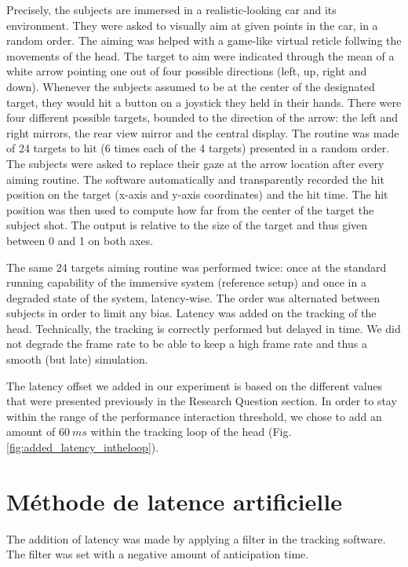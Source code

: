 	\par Precisely, the subjects are immersed in a realistic-looking car and its environment. They were  asked to visually aim at given points in the car, in a random order. The aiming was helped with a game-like virtual reticle follwing the movements of the head. The target to aim were indicated through the mean of a white arrow pointing one out of four possible directions (left, up, right and down). Whenever the subjects assumed to be at the center of the designated target, they would hit a button on a joystick they held in their hands. There were four different possible targets, bounded to the direction of the arrow: the left and right mirrors, the rear view mirror and the central display. The routine was made of 24 targets to hit (6 times each of the 4 targets) presented in a random order. The subjects were asked to replace their gaze at the arrow location after every aiming routine. The software automatically and transparently recorded the hit position on the target (x-axis and y-axis coordinates) and the hit time. The hit position was then used to compute how far from the center of the target the subject shot. The output is relative to the size of the target and thus given between 0 and 1 on both axes.


	\par The same 24 targets aiming routine was performed twice: once at the standard running capability of the immersive system (reference setup) and once in a degraded state of the system, latency-wise. The order was alternated between subjects in order to limit any bias. Latency was added on the tracking of the head. Technically, the tracking is correctly performed but delayed in time. We did not degrade the frame rate to be able to keep a high frame rate and thus a smooth (but late) simulation.

	\par The latency offset we added in our experiment is based on the different values that were presented previously in the Research Question section. In order to stay within the range of the performance interaction threshold, we chose to add an amount of $60~ms$ within the tracking loop of the head (Fig. \ref{fig:added_latency_intheloop}).
		
	\section{Méthode de latence artificielle}
	\par The addition of latency was made by applying a filter in the tracking software. The filter was set with a negative amount of anticipation time.
	
